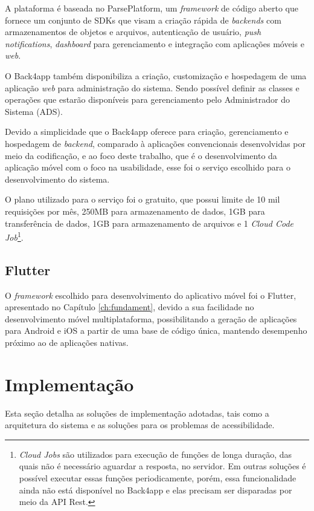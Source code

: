 A plataforma é baseada no ParsePlatform, um \emph{framework} de código aberto que fornece um conjunto de SDKs que visam a criação rápida de \emph{backends}
com armazenamentos de objetos e arquivos, autenticação de usuário, \emph{push notifications}, \emph{dashboard} para gerenciamento e integração com aplicações móveis e \emph{web}.

O Back4app também disponibiliza a criação, customização e hospedagem de uma aplicação \emph{web} para administração do sistema.
Sendo possível definir as classes e operações que estarão disponíveis para gerenciamento pelo Administrador do Sistema (ADS).

Devido a simplicidade que o Back4app oferece para criação, gerenciamento e hospedagem de \emph{backend}, comparado
à aplicações convencionais desenvolvidas por meio da codificação, e ao foco deste trabalho, que é o
desenvolvimento da aplicação móvel com o foco na usabilidade, esse foi o serviço escolhido para o desenvolvimento do sistema.

O plano utilizado para o serviço foi o gratuito, que possui limite de 10 mil requisições por mês, 250MB para armazenamento de dados,
1GB para transferência de dados, 1GB para armazenamento de arquivos e 1 \emph{Cloud Code Job}\footnote{\emph{Cloud Jobs} são utilizados
    para execução de funções de longa duração, das quais não é necessário aguardar a resposta, no servidor. Em outras soluções é possível
    executar essas funções periodicamente, porém, essa funcionalidade ainda não está disponível no Back4app e elas precisam ser disparadas
    por meio da API Rest.}.

\subsection{Flutter}

O \emph{framework} escolhido para desenvolvimento do aplicativo móvel foi o Flutter, apresentado no Capítulo \ref{ch:fundament},
devido a sua facilidade no desenvolvimento móvel multiplataforma, possibilitando a geração de aplicações
para Android e iOS a partir de uma base de código única, mantendo desempenho próximo ao de aplicações nativas.

\section{Implementação}

Esta seção detalha as soluções de implementação adotadas, tais como a arquitetura do sistema e as soluções
para os problemas de acessibilidade.

